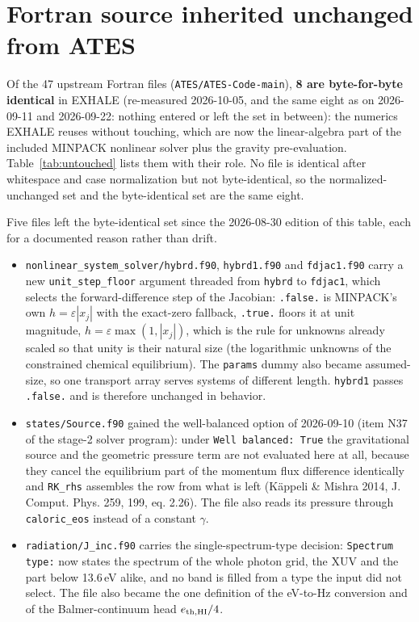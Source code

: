 \section{Fortran source inherited unchanged from ATES}\label{sec:untouched}
Of the 47 upstream Fortran files (\texttt{ATES/ATES-Code-main}), \textbf{8 are
byte-for-byte identical} in EXHALE (re-measured 2026-10-05, and the same eight
as on 2026-09-11 and 2026-09-22: nothing entered or left the set in between): the numerics
EXHALE reuses without touching, which are now the linear-algebra part of the
included \textsc{MINPACK} nonlinear solver plus the gravity pre-evaluation.
Table~\ref{tab:untouched} lists them with their role. No file is identical
after whitespace and case normalization but not byte-identical, so the
normalized-unchanged set and the byte-identical set are the same eight.

Five files left the byte-identical set since the 2026-08-30 edition of this
table, each for a documented reason rather than drift.

\begin{itemize}\itemsep2pt
\item \texttt{nonlinear\_\allowbreak system\_\allowbreak solver/\allowbreak hybrd.f90},
      \texttt{hybrd1.f90} and \texttt{fdjac1.f90} carry a new
      \texttt{unit\_step\_floor} argument threaded from \texttt{hybrd} to
      \texttt{fdjac1}, which selects the forward-difference step of the
      Jacobian: \texttt{.false.} is MINPACK's own $h = \varepsilon|x_j|$ with
      the exact-zero fallback, \texttt{.true.} floors it at unit magnitude,
      $h = \varepsilon\max(1,|x_j|)$, which is the rule for unknowns already
      scaled so that unity is their natural size (the logarithmic unknowns of
      the constrained chemical equilibrium). The \texttt{params} dummy also
      became assumed-size, so one transport array serves systems of different
      length. \texttt{hybrd1} passes \texttt{.false.} and is therefore
      unchanged in behavior.
\item \texttt{states/\allowbreak Source.f90} gained the well-balanced option of
      2026-09-10 (item N37 of the stage-2 solver program): under
      \texttt{Well balanced: True} the gravitational source and the geometric
      pressure term are not evaluated here at all, because they cancel the
      equilibrium part of the momentum flux difference identically and
      \texttt{RK\_rhs} assembles the row from what is left (K\"appeli \&
      Mishra 2014, J. Comput. Phys. 259, 199, eq. 2.26). The file also reads
      its pressure through \texttt{caloric\_eos} instead of a constant
      $\gamma$.
\item \texttt{radiation/\allowbreak J\_\allowbreak inc.f90} carries the single-spectrum-type decision:
      \texttt{Spectrum type:} now states the spectrum of the whole photon
      grid, the XUV and the part below 13.6\,eV alike, and no band is filled
      from a type the input did not select. The file also became the one
      definition of the eV-to-Hz conversion and of the Balmer-continuum head
      $e_{\rm th,HI}/4$.
\end{itemize}


